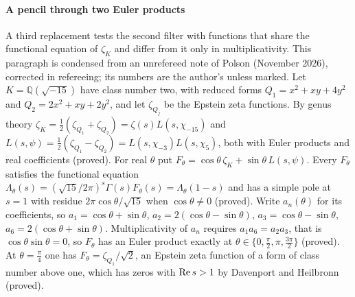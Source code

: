 \paragraph{A pencil through two Euler products}\label{route:sec:pencil} A third replacement tests the second filter with functions that share the functional equation of $\zeta_K$ and differ from it only in multiplicativity. This paragraph is condensed from an unrefereed note of Polson (November 2026), corrected in refereeing; its numbers are the author's unless marked. Let $K=\mathbb Q(\sqrt{-15})$ have class number two, with reduced forms $Q_1=x^2+xy+4y^2$ and $Q_2=2x^2+xy+2y^2$, and let $\zeta_{Q_j}$ be the Epstein zeta functions. By genus theory $\zeta_K=\frac12(\zeta_{Q_1}+\zeta_{Q_2})=\zeta(s)L(s,\chi_{-15})$ and $L(s,\psi)=\frac12(\zeta_{Q_1}-\zeta_{Q_2})=L(s,\chi_{-3})L(s,\chi_5)$, both with Euler products and real coefficients (proved). For real $\theta$ put $F_\theta=\cos\theta\,\zeta_K+\sin\theta\,L(s,\psi)$. Every $F_\theta$ satisfies the functional equation $\Lambda_\theta(s)=(\sqrt{15}/2\pi)^s\Gamma(s)F_\theta(s)=\Lambda_\theta(1-s)$ and has a simple pole at $s=1$ with residue $2\pi\cos\theta/\sqrt{15}$ when $\cos\theta\ne0$ (proved). Write $a_n(\theta)$ for its coefficients, so $a_1=\cos\theta+\sin\theta$, $a_2=2(\cos\theta-\sin\theta)$, $a_3=\cos\theta-\sin\theta$, $a_6=2(\cos\theta+\sin\theta)$. Multiplicativity of $a_n$ requires $a_1a_6=a_2a_3$, that is $\cos\theta\sin\theta=0$, so $F_\theta$ has an Euler product exactly at $\theta\in\{0,\frac\pi2,\pi,\frac{3\pi}2\}$ (proved). At $\theta=\frac\pi4$ one has $F_\theta=\zeta_{Q_1}/\sqrt2$, an Epstein zeta function of a form of class number above one, which has zeros with $\operatorname{Re} s>1$ by Davenport and Heilbronn \cite{DH36} (proved).

